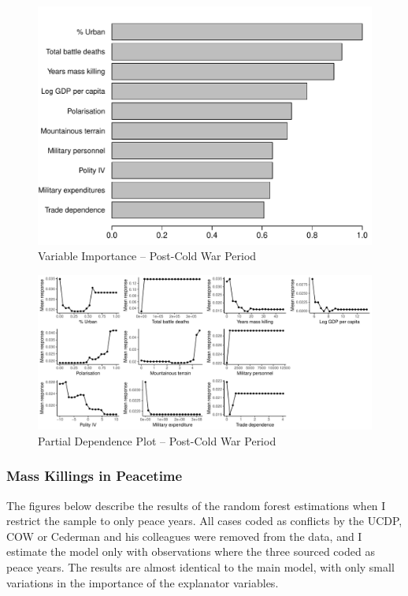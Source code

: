 \newpage

\begin{figure}[H]
    \centering
    \includegraphics[width=.85\textwidth]{images/rf-postcoldwar.pdf}
    \caption{Variable Importance -- Post-Cold War Period}
    \label{fig:rf-mk-4363}
\end{figure}

\newpage

\clearpage
\begin{figure}
    \centering
    \includegraphics[width=\textwidth]{images/rf-postcoldwar-pd.pdf}
    \caption{Partial Dependence Plot -- Post-Cold War Period}
    \label{fig:rf-mk-4363}
\end{figure}
\clearpage

\subsubsection{Mass Killings in Peacetime}

The figures below describe the results of the random forest estimations when I restrict the sample to only peace years. All cases coded as conflicts by the UCDP, COW or Cederman and his colleagues were removed from the data, and I estimate the model only with observations where the three sourced coded as peace years. The results are almost identical to the main model, with only small variations in the importance of the explanator variables.

